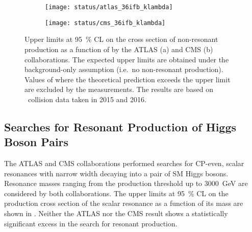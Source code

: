 \begin{figure}[htbp]
  \centering

  \begin{subfigure}[b]{0.9\textwidth}
    \centering

    \texttt{[image: status/atlas\_36ifb\_klambda]}


  \end{subfigure}

  \vspace{0.5em}

  \begin{subfigure}[b]{0.9\textwidth}
    \centering

    \texttt{[image: status/cms\_36ifb\_klambda]}

  \end{subfigure}

  \caption[Upper limits on the non-resonant \HH production cross section as a
  function of \klambda by the ATLAS and CMS collaborations based on
  \pp~collision data taken in 2015 and 2016.]{Upper limits at \SI{95}{\percent}
    CL on the cross section of non-resonant \HH production as a function of
    \klambda by the ATLAS (a) and CMS (b) collaborations. The expected upper
    limits are obtained under the background-only assumption (i.e.\ no
    non-resonant \HH production). Values of \klambda where the theoretical
    prediction exceeds the upper limit are excluded by the measurements. The
    results are based on \pp~collision data taken in 2015 and 2016.}%
  \label{fig:prior_status_klambda}
\end{figure}


\subsection*{Searches for Resonant Production of Higgs Boson Pairs}%
\label{sec:past_results_resonant}

The ATLAS and CMS collaborations performed searches for CP-even, scalar
resonances with narrow width decaying into a pair of SM Higgs bosons. Resonance
masses ranging from the \HH production threshold up to \SI{3000}{\GeV} are
considered by both collaborations. The upper limits at \SI{95}{\percent} CL on
the production cross section of the scalar resonance as a function of its mass
are shown in . Neither the ATLAS nor the CMS result
shows a statistically significant excess in the search for resonant \HH
production.

